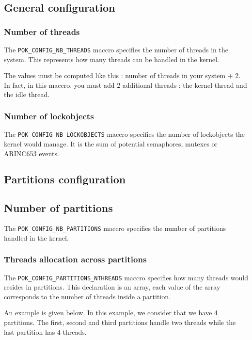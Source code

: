    \subsection{General configuration}
      \subsubsection{Number of threads}
      The \texttt{POK\_CONFIG\_NB\_THREADS} maccro specifies the number of
      threads in the system. This represents how many threads can be handled in
      the kernel.

      The values must be computed like this : number of threads in your system 
      + 2. In fact, in this maccro, you must add 2 additional threads : the
      kernel thread and the idle thread.

      \subsubsection{Number of lockobjects}
      The \texttt{POK\_CONFIG\_NB\_LOCKOBJECTS} maccro specifies the number of
      lockobjects the kernel would manage. It is the sum of potential
      semaphores, mutexes or ARINC653 events.


   \subsection{Partitions configuration}

      \subsection{Number of partitions}
      The \texttt{POK\_CONFIG\_NB\_PARTITIONS} maccro specifies the number of
      partitions handled in the kernel.


      \subsubsection{Threads allocation across partitions}
      The \texttt{POK\_CONFIG\_PARTITIONS\_NTHREADS} maccro specifies how many
      threads would resides in partitions. This declaration is an array, each
      value of the array corresponds to the number of threads inside a
      partition.

      An example is given below. In this example, we consider that we have 4
      partitions. The first, second and third partitions handle two threads while
      the last partition has 4 threads.

